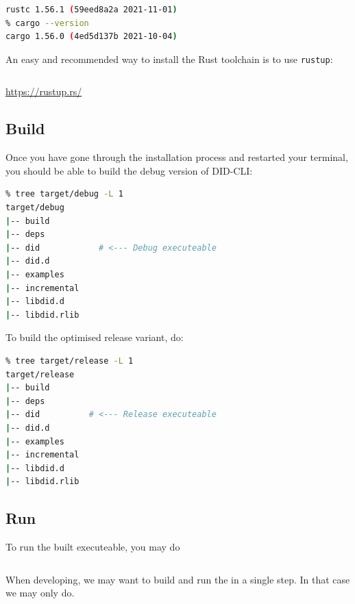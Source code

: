 \begin{lstlisting}[language=bash]
% rustc --version
rustc 1.56.1 (59eed8a2a 2021-11-01)
% cargo --version
cargo 1.56.0 (4ed5d137b 2021-10-04)
\end{lstlisting}

An easy and recommended way to install the Rust toolchain is to use
\lstinline!rustup!:

\begin{lstlisting}[language=bash]
% curl --proto '=https' --tlsv1.2 -sSf https://sh.rustup.rs | sh
\end{lstlisting}

\url{https://rustup.rs/}

\hypertarget{build}{%
\subsection{Build}\label{build}}

Once you have gone through the installation process and restarted your
terminal, you should be able to build the debug version of DID-CLI:

\begin{lstlisting}[language=bash]
% cargo build
% tree target/debug -L 1  
target/debug
|-- build
|-- deps
|-- did            # <--- Debug executeable
|-- did.d
|-- examples
|-- incremental
|-- libdid.d
|-- libdid.rlib
\end{lstlisting}

To build the optimised release variant, do:

\begin{lstlisting}[language=bash]
% cargo build --release
% tree target/release -L 1
target/release
|-- build
|-- deps
|-- did          # <--- Release executeable
|-- did.d
|-- examples
|-- incremental
|-- libdid.d
|-- libdid.rlib
\end{lstlisting}

\hypertarget{run-1}{%
\subsection{Run}\label{run-1}}

To run the built executeable, you may do

\begin{lstlisting}[language=bash]
% ./target/debug/did
\end{lstlisting}

When developing, we may want to build and run the in a single step. In
that case we may only do.

